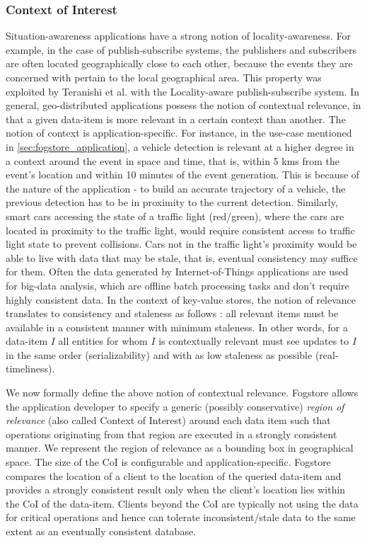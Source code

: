 \subsubsection{Context of Interest}
Situation-awareness applications have a strong notion of locality-awareness. For example, in the case of publish-subscribe systems, the publishers and subscribers are often located geographically close to each other, because the events they are concerned with pertain to the local geographical area. This property was exploited by Teranishi et al. \cite{teranishi2015scalable} with the Locality-aware publish-subscribe system. In general, geo-distributed applications possess the notion of contextual relevance, in that a given data-item is more relevant in a certain context than another. The notion of context is application-specific. For instance, in the use-case mentioned in \cref{sec:fogstore_application}, a vehicle detection is relevant at a higher degree in a context around the event in space and time, that is, within 5 kms from the event’s location and within 10 minutes of the event generation. This is because of the nature of the application - to build an accurate trajectory of a vehicle, the previous detection has to be in proximity to the current detection. Similarly, smart cars accessing the state of a traffic light (red/green), where the cars are located in proximity to the traffic light, would require consistent access to traffic light state to prevent collisions. Cars not in the traffic light's proximity would be able to live with data that may be stale, that is, eventual consistency may suffice for them. Often the data generated by Internet-of-Things applications are used for big-data analysis, which are offline batch processing tasks and don’t require highly consistent data. In the context of key-value stores, the notion of relevance translates to consistency and staleness as follows : all relevant items must be available in a consistent manner with minimum staleness. In other words, for a data-item $I$ all entities for whom $I$ is contextually relevant must see updates to $I$ in the same order (serializability) and with as low staleness as possible (real-timeliness).

\par We now formally define the above notion of contextual relevance. Fogstore allows the application developer to specify a generic (possibly conservative) \emph{region of relevance} (also called Context of Interest) around each data item such that operations originating from that region are executed in a strongly consistent manner. We represent the region of relevance as a bounding box in geographical space. The size of the CoI is configurable and application-specific. Fogstore compares the location of a client to the location of the queried data-item and provides a strongly consistent result only when the client's location lies within the CoI of the data-item. Clients beyond the CoI are typically not using the data for critical operations and hence can tolerate inconsistent/stale data to the same extent as an eventually consistent database.

